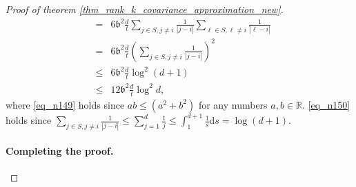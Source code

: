 \documentclass[11pt,letterpaper]{article}
\begin{document}
\begin{proof}[Proof of theorem \ref{thm_rank_k_covariance_approximation_new}]
\begin{eqnarray}
    &=& 6 \mathfrak{b}^2 \frac{d}{t} \sum_{j \in S, j \neq i} \frac{1}{|j-i|} \sum_{\ell \in S, \ell \neq i}  \frac{1}{|
    \ell - i|} \nonumber\\
        &= & 6 \mathfrak{b}^2 \frac{d}{t} \left( \sum_{j \in S, j \neq i} \frac{1}{|j-i|}\right)^2 \nonumber\\
    &\leq  & 6 \mathfrak{b}^2 \frac{d}{t} \log^2 (d+1)  \label{eq_n150}\\
    &\leq &  12 \mathfrak{b}^2 \frac{d}{t} \log^2 d,
\end{eqnarray}
%
{where \eqref{eq_n149} holds since $ab \leq (a^2 +b^2)$ for any numbers $a,b \in \mathbb{R}$.
%
% 
 \eqref{eq_n150} holds since $\sum_{j \in S, j \neq i} \frac{1}{|j-i|} \leq \sum_{j= 1}^d \frac{1}{j} \leq \int_1^{d+1} \frac{1}{s}\mathrm{d}s = \log(d+1)$.}  

\paragraph{Completing the proof.}


\end{proof}
\end{document}
